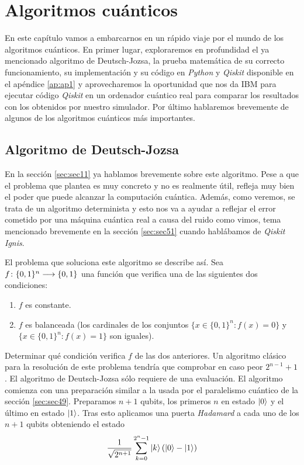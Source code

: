 \chapter{Algoritmos cuánticos}

En este capítulo vamos a embarcarnos en un rápido viaje por el mundo de los algoritmos cuánticos. En primer lugar, exploraremos en profundidad el ya mencionado algoritmo de Deutsch-Jozsa, la prueba matemática de su correcto funcionamiento, su implementación y su código en \textit{Python} y \textit{Qiskit} disponible en el apéndice \ref{ap:ap1} y aprovecharemos la oportunidad que nos da IBM para ejecutar código \textit{Qiskit} en un ordenador cuántico real para comparar los resultados con los obtenidos por nuestro simulador. Por último hablaremos brevemente de algunos de los algoritmos cuánticos más importantes.

\section{Algoritmo de Deutsch-Jozsa}
\label{sec:sec61}

En la sección \ref{sec:sec11} ya hablamos brevemente sobre este algoritmo. Pese a que el problema que plantea es muy concreto y no es realmente útil, refleja muy bien el poder que puede alcanzar la computación cuántica. Además, como veremos, se trata de un algoritmo determinista y esto nos va a ayudar a reflejar el error cometido por una máquina cuántica real  a causa del ruido como vimos, tema mencionado brevemente en la sección \ref{sec:sec51} cuando hablábamos de \textit{Qiskit Ignis}.

El problema que soluciona este algoritmo se describe así. Sea $f\colon \{0,1\}^n\longrightarrow \{0,1\}$ una función que verifica una de las siguientes dos condiciones:
\begin{enumerate}
\item $f$ es constante.
\item $f$ es balanceada (los cardinales de los conjuntos $\{x\in{\{0,1\}^n}:f(x)=0\}$ y\\ $\{x\in{\{0,1\}^n}:f(x)=1\}$ son iguales).
\end{enumerate}

Determinar qué condición verifica $f$ de las dos anteriores. Un algoritmo clásico para la resolución de este problema tendría que comprobar en caso peor $2^{n-1}+1$. El algoritmo de Deutsch-Jozsa sólo requiere de una evaluación. El algoritmo comienza con una preparación similar a la usada por el paralelismo cuántico de la sección \ref{sec:sec49}. Preparamos $n+1$ qubits, los primeros $n$ en estado $\left|0\right\rangle$ y el último en estado $\left|1\right\rangle$. Tras esto aplicamos una puerta \textit{Hadamard} a cada uno de los $n+1$ qubits obteniendo el estado
\[\dfrac{1}{\sqrt{2^{n+1}}}\sum_{k=0}^{2^n-1}\left|k\right\rangle(\left|0\right\rangle -\left|1\right\rangle)\]

